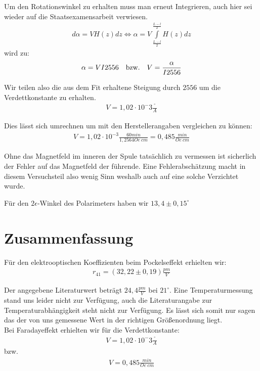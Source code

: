 \documentclass[12pt]{article}
\begin{document}
Um den Rotationswinkel zu erhalten muss man erneut Integrieren, auch hier sei wieder auf die Staatsexamensarbeit verwiesen.
\begin{align}
 d\alpha = V H(z) dz \Leftrightarrow \alpha = V \int\limits_{\frac{L-l}{2}}^{\frac{L-l}{2}} H(z) dz
\end{align}
wird zu:
\begin{align}
 \alpha = V I 2556 \quad \textnormal{bzw.} \quad V = \frac{\alpha}{I 2556}
\end{align}

Wir teilen also die aus dem Fit erhaltene Steigung durch $2556$ um die Verdettkonstante zu erhalten.
\begin{align}
 V =  1,02 \cdot 10^-3 \frac{^\circ}{A}
\end{align}

Dies lässt sich umrechnen um mit den Herstellerangaben vergleichen zu können:
\begin{align}
 V = 1,02 \cdot 10^{-3} \frac{60min}{1,2564Oe~cm} = 0,485 \frac{min}{Oe~cm}
\end{align}

Ohne das Magnetfeld im inneren der Spule tatsächlich zu vermessen ist sicherlich der Fehler auf das Magnetfeld der führende.
Eine Fehlerabschätzung macht in diesem Versuchsteil also wenig Sinn weshalb auch auf eine solche Verzichtet wurde.

Für den $2\epsilon$-Winkel des Polarimeters haben wir $13,4 \pm 0,15^\circ$

\section{Zusammenfassung}
Für den elektrooptischen Koeffizienten beim Pockelseffekt erhielten wir:
\begin{align*}
 r_{41} = (32,22 \pm 0,19) \frac{pm}{V}
\end{align*}

Der angegebene Literaturwert beträgt $24,4 \frac{pm}{V}$ bei $21^\circ$. Eine Temperaturmessung stand uns leider nicht zur Verfügung, auch die Literaturangabe zur Temperaturabhängigkeit steht nicht zur Verfügung. Es lässt sich somit nur sagen das der von uns gemessene Wert in der richtigen Größenordnung liegt.\\

Bei Faradayeffekt erhielten wir für die Verdettkonstante:
\begin{align}
 V =  1,02 \cdot 10^-3 \frac{^\circ}{A}
\end{align}
bzw.
\begin{align}
 V = 0,485 \frac{min}{Oe~cm}
\end{align}
\end{document}
